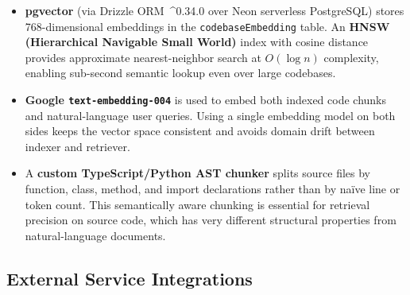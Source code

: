 \documentclass[11pt,a4paper]{report}
\newcommand{\code}[1]{\texttt{\small #1}}
\begin{document}
\begin{itemize}
  \item \textbf{pgvector} (via Drizzle ORM\ \^{}0.34.0 over Neon serverless PostgreSQL) stores 768-dimensional embeddings in the \code{codebaseEmbedding} table. An \textbf{HNSW (Hierarchical Navigable Small World)} index with cosine distance provides approximate nearest-neighbor search at $O(\log n)$ complexity, enabling sub-second semantic lookup even over large codebases.
  \item \textbf{Google \code{text-embedding-004}} is used to embed both indexed code chunks and natural-language user queries. Using a single embedding model on both sides keeps the vector space consistent and avoids domain drift between indexer and retriever.
  \item A \textbf{custom TypeScript/Python AST chunker} splits source files by function, class, method, and import declarations rather than by na\"ive line or token count. This semantically aware chunking is essential for retrieval precision on source code, which has very different structural properties from natural-language documents.
\end{itemize}

\subsection{External Service Integrations}
\end{document}
